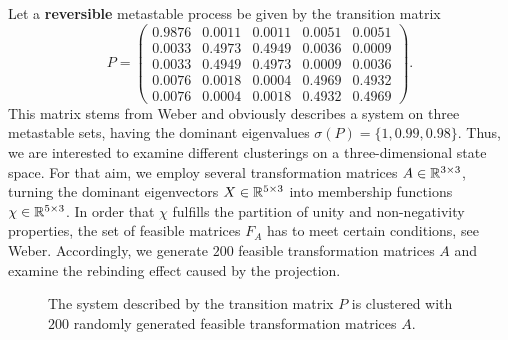 Let a \textbf{reversible} metastable process be given by the transition matrix
\begin{equation}
\label{eq:transition_matrix}
	P = 
	\begin{pmatrix}
		0.9876  &  0.0011  	&  0.0011  	&  0.0051	& 0.0051 	\\
		0.0033 	&  0.4973  	&  0.4949  	&  0.0036  	& 0.0009	\\
		0.0033  &  0.4949	&  0.4973  	&  0.0009  	& 0.0036	\\
		0.0076  &  0.0018 	&  0.0004	&  0.4969  	& 0.4932	\\
		0.0076  &  0.0004	&  0.0018   &  0.4932  	& 0.4969
	\end{pmatrix}.
\end{equation}
This matrix stems from Weber\cite{Weber2017} and obviously describes a system on three metastable sets, having the dominant eigenvalues $\sigma(P) = \{1, 0.99, 0.98\}$.
Thus, we are interested to examine different clusterings on a three-dimensional state space.
For that aim, we employ several transformation matrices $A \in \mathbb{R}^{3 \times 3}$, turning the dominant eigenvectors $X \in \mathbb{R}^{5 \times 3}$ into membership functions $\chi \in \mathbb{R}^{5 \times 3}$. In order that $\chi$ fulfills the partition of unity and non-negativity properties, the set of feasible matrices $F_A$ has to meet certain conditions, see Weber\cite[Chapter 3.4]{weber2006meshless}.
Accordingly, we generate $200$ feasible transformation matrices $A$ and examine the rebinding effect caused by the projection.

\begin{figure}[!ht]
	\centering
	\hspace{20pt}
	\caption{The system described by the transition matrix $P$ is clustered with $200$ randomly generated feasible transformation matrices $A$.} %
	\label{fig:reb_example}
\end{figure}

